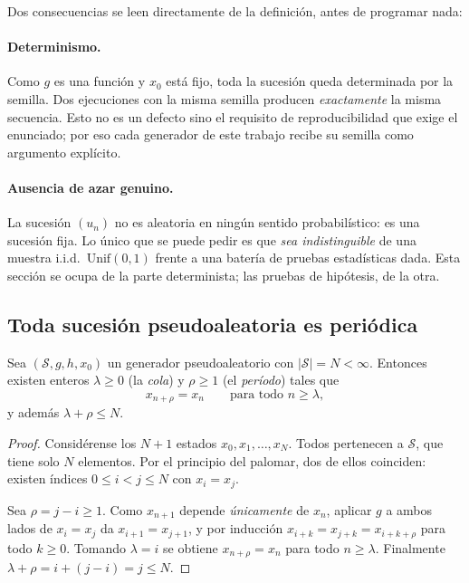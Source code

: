 Dos consecuencias se leen directamente de la definición, antes de programar nada:

\paragraph{Determinismo.} Como $g$ es una función y $x_0$ está fijo, toda la
sucesión queda determinada por la semilla. Dos ejecuciones con la misma semilla
producen \emph{exactamente} la misma secuencia. Esto no es un defecto sino el
requisito de reproducibilidad que exige el enunciado; por eso cada generador de
este trabajo recibe su semilla como argumento explícito.

\paragraph{Ausencia de azar genuino.} La sucesión $(u_n)$ no es aleatoria en
ningún sentido probabilístico: es una sucesión fija. Lo único que se puede
pedir es que \emph{sea indistinguible} de una muestra i.i.d.\ $\mathrm{Unif}(0,1)$
frente a una batería de pruebas estadísticas dada. Esta sección se ocupa de la
parte determinista; las pruebas de hipótesis, de la otra.

\subsection{Toda sucesión pseudoaleatoria es periódica}

\begin{teorema}
\label{teo:periodicidad}
Sea $(\mathcal{S}, g, h, x_0)$ un generador pseudoaleatorio con
$|\mathcal{S}| = N < \infty$. Entonces existen enteros
$\lambda \ge 0$ (la \emph{cola}) y $\rho \ge 1$ (el \emph{período}) tales que
\[
  x_{n+\rho} = x_n \qquad \text{para todo } n \ge \lambda,
\]
y además $\lambda + \rho \le N$.
\end{teorema}

\begin{proof}
Considérense los $N+1$ estados $x_0, x_1, \dots, x_N$. Todos pertenecen a
$\mathcal{S}$, que tiene solo $N$ elementos. Por el principio del palomar, dos
de ellos coinciden: existen índices $0 \le i < j \le N$ con $x_i = x_j$.

Sea $\rho = j - i \ge 1$. Como $x_{n+1}$ depende \emph{únicamente} de $x_n$,
aplicar $g$ a ambos lados de $x_i = x_j$ da $x_{i+1} = x_{j+1}$, y por inducción
$x_{i+k} = x_{j+k} = x_{i+k+\rho}$ para todo $k \ge 0$. Tomando
$\lambda = i$ se obtiene $x_{n+\rho} = x_n$ para todo $n \ge \lambda$.
Finalmente $\lambda + \rho = i + (j-i) = j \le N$.
\end{proof}

